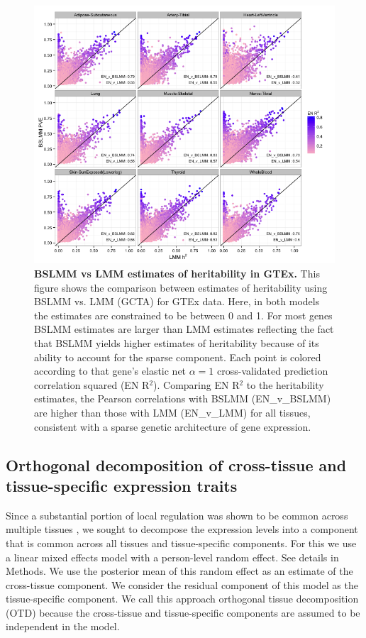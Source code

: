 \documentclass[10pt,letterpaper]{article}
\begin{document}
\begin{figure}[H]
\includegraphics[width=12cm]{Figures/Fig-GTEx_TW_PVE_v_h2.png}
\caption{{\bf BSLMM vs LMM estimates of heritability in GTEx.} 
This figure shows the comparison between estimates of heritability using BSLMM vs. LMM (GCTA) for GTEx data. Here, in both models the estimates are constrained to be between 0 and 1. For most genes BSLMM estimates are larger than LMM estimates reflecting the fact that BSLMM yields higher estimates of heritability because of its ability to account for the sparse component. Each point is colored according to that gene's elastic net \(\alpha=1\) cross-validated prediction correlation squared (EN R$^2$). Comparing EN R$^2$ to the heritability estimates, the Pearson correlations with BSLMM (EN\_v\_BSLMM) are higher than those with LMM (EN\_v\_LMM) for all tissues, consistent with a sparse genetic architecture of gene expression.}
\label{fig-gtex-pve-h2}
\end{figure}

\subsection*{Orthogonal decomposition of cross-tissue and tissue-specific expression traits}

Since a substantial portion of local regulation was shown to be common across multiple tissues \cite{Ardlie_2015}, we sought to decompose the expression levels into a component that is common across all tissues and tissue-specific components. For this we use a linear mixed effects model with a person-level random effect. See details in Methods. We use the posterior mean of this random effect as an estimate of the cross-tissue component. We consider the residual component of this model as the tissue-specific component. We call this approach orthogonal tissue decomposition (OTD) because the cross-tissue and tissue-specific components are assumed to be independent in the model. 
\end{document}
